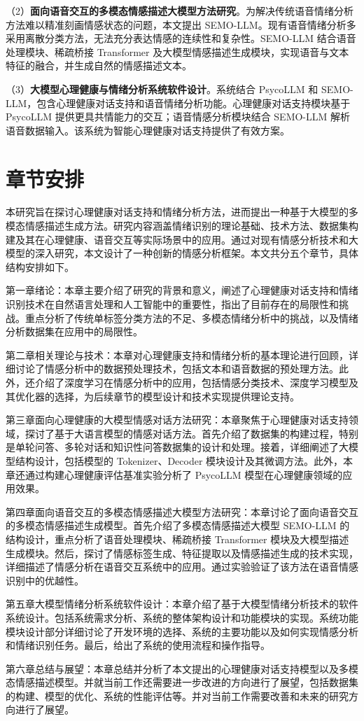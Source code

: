 （2）\textbf{面向语音交互的多模态情感描述大模型方法研究}。为解决传统语音情绪分析方法难以精准刻画情感状态的问题，本文提出 SEMO-LLM。现有语音情绪分析多采用离散分类方法，无法充分表达情感的连续性和复杂性。SEMO-LLM 结合语音处理模块、稀疏桥接 Transformer 及大模型情感描述生成模块，实现语音与文本特征的融合，并生成自然的情感描述文本。

（3）\textbf{大模型心理健康与情绪分析系统软件设计}。系统结合 PsycoLLM 和 SEMO-LLM，包含心理健康对话支持和语音情绪分析功能。心理健康对话支持模块基于 PsycoLLM 提供更具共情能力的交互；语音情感分析模块结合 SEMO-LLM 解析语音数据输入。该系统为智能心理健康对话支持提供了有效方案。

\section{章节安排}

本研究旨在探讨心理健康对话支持和情绪分析方法，进而提出一种基于大模型的多模态情感描述生成方法。研究内容涵盖情绪识别的理论基础、技术方法、数据集构建及其在心理健康、语音交互等实际场景中的应用。通过对现有情感分析技术和大模型的深入研究，本文设计了一种创新的情感分析框架。本文共分五个章节，具体结构安排如下。

第一章绪论：本章主要介绍了研究的背景和意义，阐述了心理健康对话支持和情绪识别技术在自然语言处理和人工智能中的重要性，指出了目前存在的局限性和挑战。重点分析了传统单标签分类方法的不足、多模态情绪分析中的挑战，以及情绪分析数据集在应用中的局限性。

第二章相关理论与技术：本章对心理健康支持和情绪分析的基本理论进行回顾，详细讨论了情感分析中的数据预处理技术，包括文本和语音数据的预处理方法。此外，还介绍了深度学习在情感分析中的应用，包括情感分类技术、深度学习模型及其优化器的选择，为后续章节的模型设计和技术实现提供理论支持。

第三章面向心理健康的大模型情感对话方法研究：本章聚焦于心理健康对话支持领域，探讨了基于大语言模型的情感对话方法。首先介绍了数据集的构建过程，特别是单轮问答、多轮对话和知识性问答数据集的设计和处理。接着，详细阐述了大模型结构设计，包括模型的 Tokenizer、Decoder 模块设计及其微调方法。此外，本章还通过构建心理健康评估基准实验分析了 PsycoLLM 模型在心理健康领域的应用效果。

第四章面向语音交互的多模态情感描述大模型方法研究：本章讨论了面向语音交互的多模态情感描述生成模型。首先介绍了多模态情感描述大模型 SEMO-LLM 的结构设计，重点分析了语音处理模块、稀疏桥接 Transformer 模块及大模型描述生成模块。然后，探讨了情感标签生成、特征提取以及情感描述生成的技术实现，详细描述了情感分析在语音交互系统中的应用。通过实验验证了该方法在语音情感识别中的优越性。

第五章大模型情绪分析系统软件设计：本章介绍了基于大模型情绪分析技术的软件系统设计。包括系统需求分析、系统的整体架构设计和功能模块的实现。系统功能模块设计部分详细讨论了开发环境的选择、系统的主要功能以及如何实现情感分析和情绪识别任务。最后，给出了系统的使用流程和操作指导。

第六章总结与展望：本章总结并分析了本文提出的心理健康对话支持模型以及多模态情感描述模型。并就当前工作还需要进一步改进的方向进行了展望，包括数据集的构建、模型的优化、系统的性能评估等。并对当前工作需要改善和未来的研究方向进行了展望。